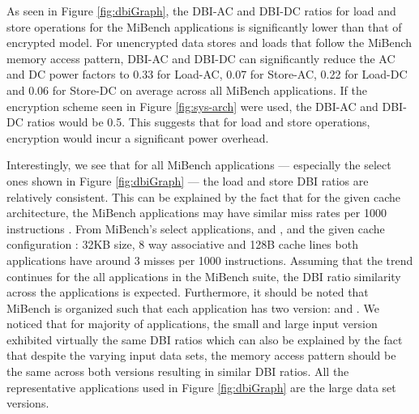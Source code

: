 As seen in Figure \ref{fig:dbiGraph}, the DBI-AC and DBI-DC ratios for load and
store operations for the MiBench applications is significantly lower than that
of encrypted model. For unencrypted data stores and loads that follow the
MiBench memory access pattern, DBI-AC and DBI-DC can significantly reduce the
AC and DC power factors to 0.33 for Load-AC, 0.07 for Store-AC, 0.22 for
Load-DC and 0.06 for Store-DC on average across all MiBench applications. If
the encryption scheme seen in Figure \ref{fig:sys-arch} were used, the DBI-AC
and DBI-DC ratios would be 0.5. This suggests that for load and store
operations, encryption would incur a significant power overhead.

Interestingly, we see that for all MiBench applications --- especially the
select ones shown in Figure \ref{fig:dbiGraph} --- the load and store DBI
ratios are relatively consistent. This can be explained by the fact that for
the given cache architecture, the MiBench applications may have similar miss
rates per 1000 instructions \cite{mibench}. From MiBench's select applications,
 and , and the given cache configuration : 32KB size,
8 way associative and 128B cache lines both applications have around 3 misses
per 1000 instructions. Assuming that the trend continues for the all
applications in the MiBench suite, the DBI ratio similarity across the
applications is expected. Furthermore, it should be noted that MiBench is
organized such that each application has two version:  and
. We noticed that for majority of applications, the small and
large input version exhibited virtually the same DBI ratios which can also be
explained by the fact that despite the varying input data sets, the memory
access pattern should be the same across both versions resulting in similar DBI
ratios. All the representative applications used in Figure \ref{fig:dbiGraph}
are the large data set versions.
